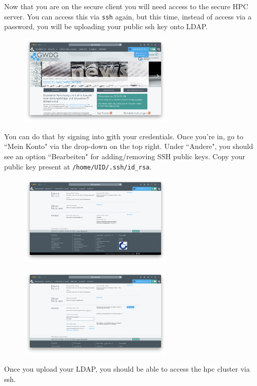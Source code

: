 \documentclass[paper=a4]{scrartcl}
\begin{document}
Now that you are on the secure client you will need access to the secure HPC server. 
You can access this via \texttt{ssh} again, but this time, instead of access via a password, you will be uploading your public ssh key onto LDAP.
\begin{figure}[!ht]
    \centerline{\includegraphics[width=0.65\textwidth]{gwdg1.png}}
    \caption{}
    \label{fig:screenshot1}
\end{figure}
You can do that by signing into \href{https://www.gwdg.de} with your credentials. 
Once you're in, go to ``Mein Konto" via the drop-down on the top right. Under ``Andere", you should see an option ``Bearbeiten" for adding/removing SSH public keys. 
Copy your public key present at \texttt{/home/UID/.ssh/id\_rsa}. 

\begin{figure}[!ht]
    \centerline{\includegraphics[width=0.65\textwidth]{gwdg2.png}}
    \caption{}
    \label{fig:screenshot2}
\end{figure}

\begin{figure}[!ht]
    \centerline{\includegraphics[width=0.65\textwidth]{gwdg3.png}}
    \caption{}
    \label{fig:screenshot3}
\end{figure}
Once you upload your LDAP, you should be able to access the hpc cluster via ssh. 
\end{document}
